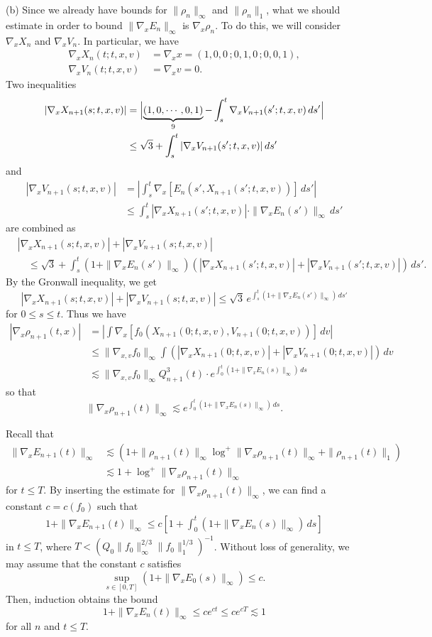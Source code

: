 \documentclass{article}
\begin{document}
\begin{pf}
(b)
Since we already have bounds for $\|\rho_n\|_\infty$ and $\|\rho_n\|_1$, what we should estimate in order to bound $\|\nabla_xE_n\|_\infty$ is $\nabla_x\rho_n$.
To do this, we will consider $\nabla_xX_n$ and $\nabla_xV_n$.
In particular, we have
\begin{align*}
\nabla_xX_n(t;t,x,v)&=\nabla_xx=(1,0,0\,;0,1,0\,;0,0,1),\\
\nabla_xV_n(t;t,x,v)&=\nabla_xv=0.
\end{align*}
Two inequalities
\begin{align*}
|\nabla_xX_{n+1}(s;t,x,v)|
&=\Bigl|\underbrace{(1,0,\cdots,0,1)}_{9}-\int_s^t\nabla_xV_{n+1}(s';t,x,v)\,ds'\Bigr|\\
&\le\sqrt3+\int_s^t|\nabla_xV_{n+1}(s';t,x,v)|\,ds'
\end{align*}
and
\begin{align*}
|\nabla_xV_{n+1}(s;t,x,v)|
&=|\int_s^t\nabla_x[E_n(s',X_{n+1}(s';t,x,v))]\,ds'|\\
&\le\int_s^t|\nabla_xX_{n+1}(s';t,x,v)|\cdot\|\nabla_xE_n(s')\|_\infty\,ds'
\end{align*}
are combined as
\begin{align*}
&|\nabla_xX_{n+1}(s;t,x,v)|+|\nabla_xV_{n+1}(s;t,x,v)|\\
&\quad\le\sqrt3+\int_s^t(1+\|\nabla_xE_n(s')\|_\infty)(|\nabla_xX_{n+1}(s';t,x,v)|+|\nabla_xV_{n+1}(s';t,x,v)|)\,ds'.
\end{align*}
By the Gronwall inequality, we get
\[|\nabla_xX_{n+1}(s;t,x,v)|+|\nabla_xV_{n+1}(s;t,x,v)|\le\sqrt3\,e^{\int_s^t(1+\|\nabla_xE_n(s')\|_\infty)\,ds'}\]
for $0\le s\le t$.
Thus we have
\begin{align*}
|\nabla_x\rho_{n+1}(t,x)|
&=|\int\nabla_x[f_0(X_{n+1}(0;t,x,v),V_{n+1}(0;t,x,v))]\,dv|\\
&\le\|\nabla_{x,v}f_0\|_\infty\int(|\nabla_xX_{n+1}(0;t,x,v)|+|\nabla_xV_{n+1}(0;t,x,v)|)\,dv\\
&\lesssim\|\nabla_{x,v}f_0\|_\infty Q_{n+1}^3(t)\cdot e^{\int_0^t(1+\|\nabla_xE_n(s)\|_\infty)\,ds}
\end{align*}
so that
\[\|\nabla_x\rho_{n+1}(t)\|_\infty\lesssim e^{\int_0^t(1+\|\nabla_xE_n(s)\|_\infty)\,ds}.\]

Recall that
\begin{align*}
\|\nabla_xE_{n+1}(t)\|_\infty
&\lesssim(1+\|\rho_{n+1}(t)\|_\infty\log^+\|\nabla_x\rho_{n+1}(t)\|_\infty+\|\rho_{n+1}(t)\|_1)\\
&\lesssim1+\log^+\|\nabla_x\rho_{n+1}(t)\|_\infty
\end{align*}
for $t\le T$.
By inserting the estimate for $\|\nabla_x\rho_{n+1}(t)\|_\infty$, we can find a constant $c=c(f_0)$ such that
\begin{align*}
1+\|\nabla_xE_{n+1}(t)\|_\infty\le c[1+\int_0^t(1+\|\nabla_xE_n(s)\|_\infty)\,ds]
\end{align*}
in $t\le T$, where $T<(Q_0\|f_0\|_\infty^{2/3}\|f_0\|_1^{1/3})^{-1}$.
Without loss of generality, we may assume that the constant $c$ satisfies
\[\sup_{s\in[0,T]}(1+\|\nabla_xE_0(s)\|_\infty)\le c.\]
Then, induction obtains the bound
\[1+\|\nabla_xE_n(t)\|_\infty\le ce^{ct}\le ce^{cT}\lesssim1\]
for all $n$ and $t\le T$.
\end{pf}
\end{document}
